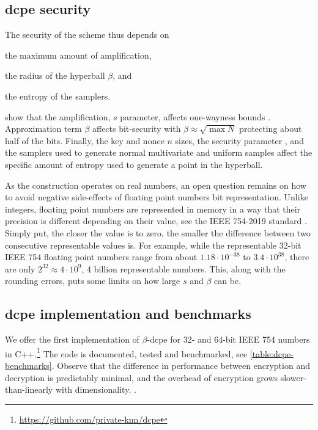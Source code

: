 			

		\subsection{\texorpdfstring{\acrshort{dcpe}}{DCPE} security}

			The security of the scheme thus depends on
			\begin{enumerate*}[label={(\roman*)}]
				\item the maximum amount of amplification,
				\item the radius of the hyperball $\beta$, and
				\item the entropy of the samplers.
			\end{enumerate*}
			\textcite{dcpe} show that the amplification, $s$ parameter, affects one-wayness bounds \cite[Section 7.2]{dcpe}.
			Approximation term $\beta$ affects bit-security with $\beta \approx \sqrt{\max N}$ protecting about half of the bits.
			Finally, the key \key{} and nonce $n$ sizes, the security parameter \secparam{}, and the samplers used to generate normal multivariate and uniform samples affect the specific amount of entropy used to generate a point in the hyperball.

			As the construction operates on real numbers, an open question remains on how to avoid negative side-effects of floating point numbers bit representation.
			Unlike integers, floating point numbers are represented in memory in a way that their precision is different depending on their value, see the IEEE 754-2019 standard \cite{ieee-floating-point}. %
			Simply put, the closer the value is to zero, the smaller the difference between two consecutive representable values is.
			For example, while the representable 32-bit IEEE 754 floating point numbers range from about $1.18 \cdot 10^{-38}$ to $3.4 \cdot 10^{38}$, there are only $2^{32} \approx 4 \cdot 10^9$, 4 billion representable numbers.
			This, along with the rounding errors, puts some limits on how large $s$ and $\beta$ can be.

		\subsection{\texorpdfstring{\acrshort{dcpe}}{DCPE} implementation and benchmarks}

			We offer the first implementation of \cite{dcpe} $\beta$-\acrshort{dcpe} for 32- and 64-bit IEEE 754 numbers in C++.\footnote{
				\url{https://github.com/private-knn/dcpe}
			}
			The code is documented, tested and benchmarked, see \cref{table:dcpe-benchmarks}.
			Observe that the difference in performance between encryption and decryption is predictably minimal, and the overhead of encryption grows slower-than-linearly with dimensionality.
.
			

